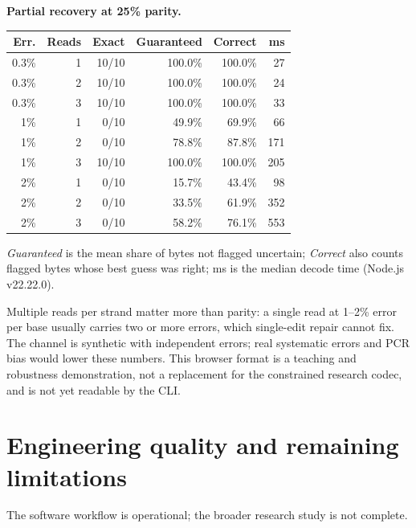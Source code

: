 \documentclass[11pt,a4paper]{article}
\newcommand{\pageheading}[2]{\clearpage\section{#1}{\color{muted}\small #2}\par\vspace{5pt}}
\begin{document}
\par\noindent\begin{minipage}{\linewidth}
\textbf{Partial recovery at 25\% parity.}
\begin{center}\small
\begin{tabular}{rrrrrr}
\toprule
Err. & Reads & Exact & Guaranteed & Correct & ms\\
\midrule
0.3\% & 1 & 10/10 & 100.0\% & 100.0\% & 27 \\
0.3\% & 2 & 10/10 & 100.0\% & 100.0\% & 24 \\
0.3\% & 3 & 10/10 & 100.0\% & 100.0\% & 33 \\
1\% & 1 & 0/10 & 49.9\% & 69.9\% & 66 \\
1\% & 2 & 0/10 & 78.8\% & 87.8\% & 171 \\
1\% & 3 & 10/10 & 100.0\% & 100.0\% & 205 \\
2\% & 1 & 0/10 & 15.7\% & 43.4\% & 98 \\
2\% & 2 & 0/10 & 33.5\% & 61.9\% & 352 \\
2\% & 3 & 0/10 & 58.2\% & 76.1\% & 553 \\
\bottomrule
\end{tabular}
\end{center}
\end{minipage}
{\small \emph{Guaranteed} is the mean share of bytes not flagged
uncertain; \emph{Correct} also counts flagged bytes whose best guess was right; ms is the
median decode time (Node.js v22.22.0).}

Multiple reads per strand matter more than parity: a single read at 1--2\% error per base
usually carries two or more errors, which single-edit repair cannot fix. The channel is
synthetic with independent errors; real systematic errors and PCR bias would lower these
numbers. This browser format is a teaching and robustness demonstration, not a replacement
for the constrained research codec, and is not yet readable by the CLI.

\pageheading{Engineering quality and remaining limitations}{The software workflow is operational; the broader research study is not complete.}
\end{document}
